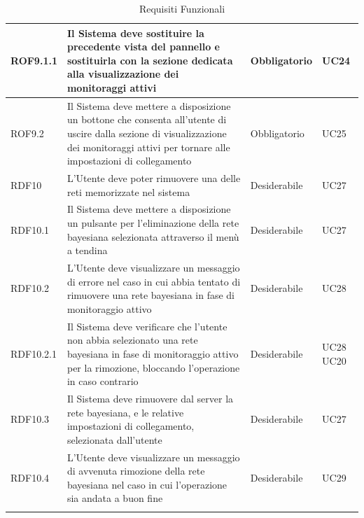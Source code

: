 \begin{center}
\begin{longtable}[c]{|m{}|m{}|m{}|m{}|}
\hline
\rowcolor{grigio}ROF9.1.1 & Il Sistema deve sostituire la precedente vista del pannello e sostituirla con la sezione dedicata alla visualizzazione dei monitoraggi attivi & Obbligatorio & UC24\\
\hline
ROF9.2 & Il Sistema deve mettere a disposizione un bottone che consenta all'utente di uscire dalla sezione di visualizzazione dei monitoraggi attivi per tornare alle impostazioni di collegamento  & Obbligatorio & UC25\\
\hline
\rowcolor{grigio}RDF10 & L'Utente deve poter rimuovere una delle reti memorizzate nel sistema & Desiderabile & UC27\\
\hline
RDF10.1 & Il Sistema deve mettere a disposizione un pulsante per l'eliminazione della rete bayesiana selezionata attraverso il menù a tendina & Desiderabile & UC27\\
\hline
\rowcolor{grigio}RDF10.2 & L'Utente deve visualizzare un messaggio di errore nel caso in cui abbia tentato di rimuovere una rete bayesiana in fase di monitoraggio attivo & Desiderabile & UC28\\
\hline
RDF10.2.1 & Il Sistema deve verificare che l'utente non abbia selezionato una rete bayesiana in fase di monitoraggio attivo per la rimozione, bloccando l'operazione in caso contrario & Desiderabile & UC28 UC20\\
\hline
\rowcolor{grigio}RDF10.3 & Il Sistema deve rimuovere dal server la rete bayesiana, e le relative impostazioni di collegamento, selezionata dall'utente & Desiderabile & UC27\\
\hline
RDF10.4 & L'Utente deve visualizzare un messaggio di avvenuta rimozione della rete bayesiana nel caso in cui l'operazione sia andata a buon fine & Desiderabile & UC29\\
\hline
\caption{Requisiti Funzionali}
\end{longtable}
\end{center}


